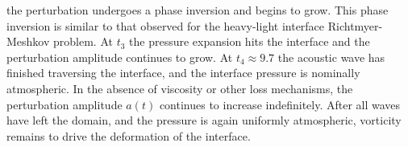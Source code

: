 the perturbation undergoes a phase inversion and begins to grow. This
phase inversion is similar to that observed for the heavy-light
interface Richtmyer-Meshkov problem. At $t_3$ the pressure expansion
hits the interface and the perturbation amplitude continues to
grow. At $t_4\approx9.7$ the acoustic wave has finished traversing the
interface, and the interface pressure is nominally atmospheric. In the
absence of viscosity or other loss mechanisms, the perturbation
amplitude $a(t)$ continues to increase indefinitely. After all waves
have left the domain, and the pressure is again uniformly atmospheric,
vorticity remains to drive the deformation of the interface.
% 
% 
